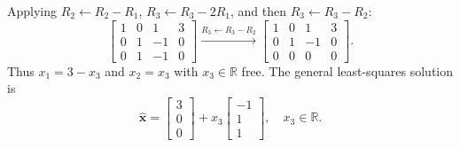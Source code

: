 \documentclass[11pt, letterpaper]{article}
\theoremstyle{definition}
\theoremstyle{remark}
\begin{document}
Applying $R_2 \leftarrow R_2 - R_1$, $R_3 \leftarrow R_3 - 2R_1$, and then $R_3 \leftarrow R_3 - R_2$:
\[
\left[\begin{array}{ccc|c} 1 & 0 & 1 & 3 \\ 0 & 1 & -1 & 0 \\ 0 & 1 & -1 & 0 \end{array}\right] \xrightarrow{R_3 \leftarrow R_3 - R_2} \left[\begin{array}{ccc|c} 1 & 0 & 1 & 3 \\ 0 & 1 & -1 & 0 \\ 0 & 0 & 0 & 0 \end{array}\right].
\]
Thus $x_1 = 3 - x_3$ and $x_2 = x_3$ with $x_3 \in \mathbb{R}$ free. The general least-squares solution is
\[
\hat{\mathbf{x}} = \begin{bmatrix} 3 \\ 0 \\ 0 \end{bmatrix} + x_3 \begin{bmatrix} -1 \\ 1 \\ 1 \end{bmatrix}, \quad x_3 \in \mathbb{R}.
\]
\end{document}
